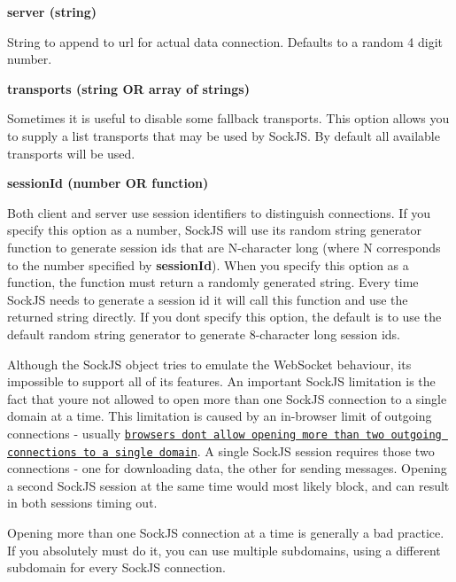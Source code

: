 \begin{DoxyItemize}
\item {\bfseries server (string)}

String to append to url for actual data connection. Defaults to a random 4 digit number.
\item {\bfseries transports (string OR array of strings)}

Sometimes it is useful to disable some fallback transports. This option allows you to supply a list transports that may be used by Sock\+JS. By default all available transports will be used.
\item {\bfseries session\+Id (number OR function)}

Both client and server use session identifiers to distinguish connections. If you specify this option as a number, Sock\+JS will use its random string generator function to generate session ids that are N-\/character long (where N corresponds to the number specified by {\bfseries session\+Id}). When you specify this option as a function, the function must return a randomly generated string. Every time Sock\+JS needs to generate a session id it will call this function and use the returned string directly. If you don\textquotesingle{}t specify this option, the default is to use the default random string generator to generate 8-\/character long session ids.
\end{DoxyItemize}

Although the \textquotesingle{}Sock\+JS\textquotesingle{} object tries to emulate the \textquotesingle{}Web\+Socket\textquotesingle{} behaviour, it\textquotesingle{}s impossible to support all of its features. An important Sock\+JS limitation is the fact that you\textquotesingle{}re not allowed to open more than one Sock\+JS connection to a single domain at a time. This limitation is caused by an in-\/browser limit of outgoing connections -\/ usually \href{https://stackoverflow.com/questions/985431/max-parallel-http-connections-in-a-browser}{\tt browsers don\textquotesingle{}t allow opening more than two outgoing connections to a single domain}. A single Sock\+JS session requires those two connections -\/ one for downloading data, the other for sending messages. Opening a second Sock\+JS session at the same time would most likely block, and can result in both sessions timing out.

Opening more than one Sock\+JS connection at a time is generally a bad practice. If you absolutely must do it, you can use multiple subdomains, using a different subdomain for every Sock\+JS connection.

